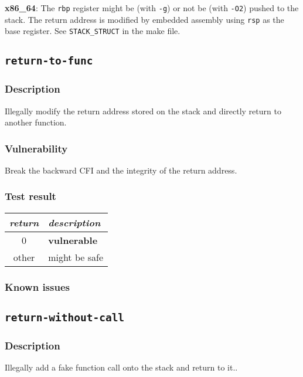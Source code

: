 \documentclass[a4paper]{book}
\begin{document}
\textbf{x86\_64}: The \texttt{rbp} register might be (with \texttt{-g}) or not be (with \texttt{-O2}) pushed to the stack.
The return address is modified by embedded assembly using \texttt{rsp} as the base register. See \texttt{STACK\_STRUCT} in the make file.

\newpage
\subsection{\texttt{return-to-func}}\label{test-return-to-func}

\subsubsection{Description}
Illegally modify the return address stored on the stack and directly return to another function.

\subsubsection{Vulnerability}
Break the backward CFI and the integrity of the return address.

\subsubsection{Test result}
\begin{tabular}{cl}
  \toprule
  \emph{return}  & \emph{description} \\
  \midrule
  0              & \textbf{vulnerable} \\
  other          & might be safe \\
  \bottomrule
\end{tabular}
  
\subsubsection{Known issues}

\newpage
\subsection{\texttt{return-without-call}}\label{test-return-without-call}

\subsubsection{Description}
Illegally add a fake function call onto the stack and return to it..
\end{document}

